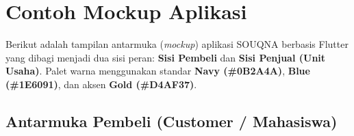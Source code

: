 \documentclass[11pt, a4paper]{article}
\begin{document}
\clearpage

\section{Contoh Mockup Aplikasi}

Berikut adalah tampilan antarmuka (\textit{mockup}) aplikasi SOUQNA berbasis Flutter yang dibagi menjadi dua sisi peran: \textbf{Sisi Pembeli} dan \textbf{Sisi Penjual (Unit Usaha)}. Palet warna menggunakan standar \textbf{Navy (\#0B2A4A)}, \textbf{Blue (\#1E6091)}, dan aksen \textbf{Gold (\#D4AF37)}.

\subsection{Antarmuka Pembeli (Customer / Mahasiswa)}

\vspace{0.15cm}
\end{document}
